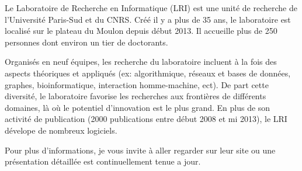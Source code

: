 Le Laboratoire de Recherche en Informatique (\textsc{LRI}) est une unité de recherche de l'Université Paris-Sud et du \textsc{CNRS}.
Créé il y a plus de 35 ans, le laboratoire est localisé sur le plateau du Moulon depuis début 2013.
Il accueille plus de 250 personnes dont environ un tier de doctorants.


Organisés en neuf équipes, les recherche du laboratoire incluent à la fois des aspects théoriques et appliqués (ex: algorithmique, réseaux et bases de données, graphes, bioinformatique, interaction homme-machine, ect).
De part cette diversité, le laboratoire favorise les recherches aux frontières de différents domaines, là où le potentiel d'innovation est le plus grand.
En plus de son activité de publication (2000 publications entre début 2008 et mi 2013), le LRI dévelope de nombreux logiciels.


Pour plus d'informations, je vous invite à aller regarder sur leur site ou une présentation détaillée est continuellement tenue a jour\cite{LRI}.

